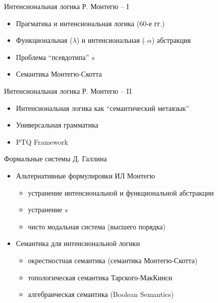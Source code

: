 \documentclass{beamer}
\begin{document}
\begin{frame}{Интенсиональная логика Р. Монтегю -- I}
\begin{itemize}
    \item Прагматика и интенсиональная логика (60-е гг.)
    \medskip
    \item Функциональная ($\lambda$) и интенсиональная (\,$\hat{} \, \alpha$) абстракция
    \medskip 
    \item Проблема ``псевдотипа'' $s$
    \medskip
    \item Семантика Монтегю-Скотта    
\end{itemize}
\end{frame}

\begin{frame}{Интенсиональная логика Р. Монтегю -- II}
\begin{itemize}
    \item Интенсиональная логика как ``семантический метаязык''
    \medskip
    \item Универсальная грамматика
    \medskip 
    \item PTQ Framework
\end{itemize}
\end{frame}

\begin{frame}{Формальные системы Д. Галлина}
\begin{itemize}
    \item Альтернативные формулировки ИЛ Монтегю
    \medskip
        \begin{itemize}
            \item устранение интенсиональной и функциональной абстракции
            \item устранение $s$
            \item чисто модальная система (высшего порядка)
        \end{itemize}            
    \medskip
    \item Семантика для интенсиональной логики
    \medskip
        \begin{itemize}
            \item окрестностная семантика (семантика Монтегю-Скотта)
            \item топологическая семантика Тарского-МакКинси
            \item алгебраическая семантика (Boolean Semantics)
        \end{itemize}            
\end{itemize}
\end{frame}
\end{document}
